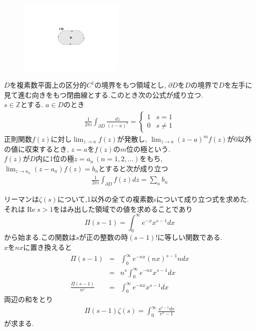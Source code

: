 \begin{figure}
\vspace{-2\baselineskip}
\begin{center}
\includegraphics[width=50mm]{zetamura1.pdf}
\end{center}
\end{figure}
$D$を複素数平面上の区分的$C^1$の境界をもつ領域とし, $\partial D$を$D$の境界で$D$を左手に見て進む向きをもつ閉曲線とする.このとき次の公式が成り立つ.\\
$s\in \mathbb{Z}$とする. $a\in D$のとき
\begin{eqnarray*}
\frac{1}{2\pi i}\int_{\partial D} \frac{dz}{(z-a)^s} = \begin{cases}
1 & s=1 \\ 
0 & s\neq1
\end{cases}
\end{eqnarray*}
正則関数$f(z)$に対し$\displaystyle{\lim_{z\to a}f(z)}$が発散し, $\displaystyle{\lim_{z\to a}(z-a)^m f(z)}$が0以外の値に収束するとき, $z=a$を$f(z)$の$m$位の極という.\\
$f(z)$が$D$内に1位の極$z=a_n\,(n=1,2,\ldots)$をもち, $\displaystyle{\lim_{z\to a_n}(z-a_n)f(z)}=b_n$とすると次が成り立つ
\begin{eqnarray*}
\frac{1}{2\pi i}\int_{\partial D} f(z)dz = \sum_n b_n
\end{eqnarray*}

リーマンは$\zeta(s)$について,1以外の全ての複素数sについて成り立つ式を求めた.\\
それは$\operatorname{Re} s>1$をはみ出した領域での値を求めることであり
\[
\Pi(s-1)=\int_0^\infty e^{-x}x^{s-1}dx
\]
から始まる.この関数は$s$が正の整数の時$(s-1)!$に等しい関数である.\\
$x$を$nx$に置き換えると
\begin{eqnarray*}
\Pi(s-1) &=& \int_0^\infty e^{-nx}(nx)^{s-1}ndx\\
&=& n^s \int_0^\infty e^{-nx}x^{s-1}dx\\
\frac{\Pi(s-1)}{n^s} &=& \int_0^\infty e^{-nx}x^{s-1}dx
\end{eqnarray*}
両辺の和をとり
\begin{align}
\Pi(s-1)\zeta(s)=\int_0^\infty \frac{x^{s-1}dx}{e^x-1}\label{eq:1}
\end{align}
が求まる.\\

